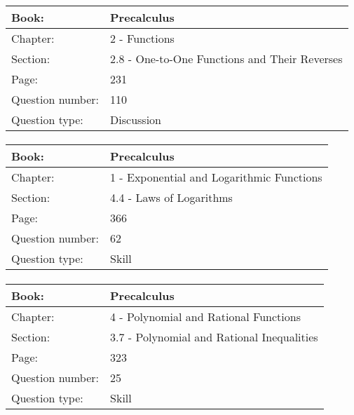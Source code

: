 \documentclass{article}
\begin{document}
   \paragraph{}
   \begin{tabularx}{1\textwidth}{
           p{}
           p{}
       }
       \toprule
       Book: & Precalculus
       \\
       \midrule
       Chapter: & 2 - Functions
       \\
       \midrule
       Section: & 2.8 - One-to-One Functions and Their Reverses
       \\
       \midrule
       Page: & 231
       \\
       \midrule
       Question number: & 110
       \\
       \midrule
       Question type: & Discussion
       \\
       \bottomrule
   \end{tabularx}



   \paragraph{}
   \begin{tabularx}{1\textwidth}{
           p{}
           p{}
       }
       \toprule
       Book: & Precalculus
       \\
       \midrule
       Chapter: & 1 - Exponential and Logarithmic Functions
       \\
       \midrule
       Section: & 4.4 - Laws of Logarithms
       \\
       \midrule
       Page: & 366
       \\
       \midrule
       Question number: & 62
       \\
       \midrule
       Question type: & Skill
       \\
       \bottomrule
   \end{tabularx}



   \paragraph{}
   \begin{tabularx}{1\textwidth}{
           p{}
           p{}
       }
       \toprule
       Book: & Precalculus
       \\
       \midrule
       Chapter: & 4 - Polynomial and Rational Functions
       \\
       \midrule
       Section: & 3.7 - Polynomial and Rational Inequalities
       \\
       \midrule
       Page: & 323
       \\
       \midrule
       Question number: & 25
       \\
       \midrule
       Question type: & Skill
       \\
       \bottomrule
   \end{tabularx}
\end{document}
